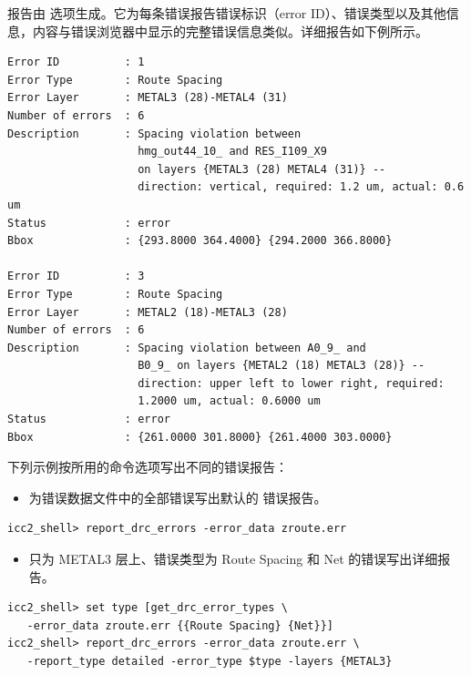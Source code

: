  报告由  选项生成。它为每条错误报告错误标识（error ID）、错误类型以及其他信息，内容与错误浏览器中显示的完整错误信息类似。详细报告如下例所示。

\begin{lstlisting}
Error ID          : 1
Error Type        : Route Spacing
Error Layer       : METAL3 (28)-METAL4 (31)
Number of errors  : 6
Description       : Spacing violation between
                    hmg_out44_10_ and RES_I109_X9
                    on layers {METAL3 (28) METAL4 (31)} --
                    direction: vertical, required: 1.2 um, actual: 0.6 um
Status            : error
Bbox              : {293.8000 364.4000} {294.2000 366.8000}

Error ID          : 3
Error Type        : Route Spacing
Error Layer       : METAL2 (18)-METAL3 (28)
Number of errors  : 6
Description       : Spacing violation between A0_9_ and
                    B0_9_ on layers {METAL2 (18) METAL3 (28)} --
                    direction: upper left to lower right, required:
                    1.2000 um, actual: 0.6000 um
Status            : error
Bbox              : {261.0000 301.8000} {261.4000 303.0000}
\end{lstlisting}

下列示例按所用的命令选项写出不同的错误报告：
\begin{itemize}
  \item 为错误数据文件中的全部错误写出默认的  错误报告。
\end{itemize}
\begin{lstlisting}
icc2_shell> report_drc_errors -error_data zroute.err
\end{lstlisting}
\begin{itemize}
  \item 只为 METAL3 层上、错误类型为 Route Spacing 和 Net 的错误写出详细报告。
\end{itemize}
\begin{lstlisting}
icc2_shell> set type [get_drc_error_types \
   -error_data zroute.err {{Route Spacing} {Net}}]
icc2_shell> report_drc_errors -error_data zroute.err \
   -report_type detailed -error_type $type -layers {METAL3}
\end{lstlisting}
